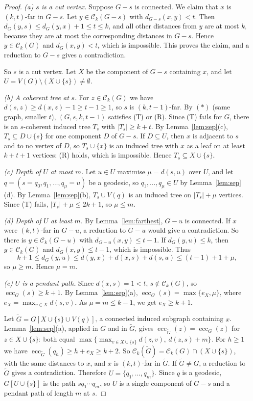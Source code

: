\documentclass[11pt,a4paper]{article}
\theoremstyle{definition}
\newcommand{\ecc}{\operatorname{ecc}}
\newcommand{\C}{\mathcal{C}}
\begin{document}
\begin{proof}
\emph{(a) $s$ is a cut vertex.} Suppose $G-s$ is connected. We claim that $x$ is $(k,t)$-far in $G-s$. Let $y\in\C_k(G-s)$ with $d_{G-s}(x,y)<t$. Then $d_G(y,s)\le d_G(y,x)+1\le t\le k$, and all other distances from $y$ are at most $k$, because they are at most the corresponding distances in $G-s$. Hence $y\in\C_k(G)$ and $d_G(x,y)<t$, which is impossible. This proves the claim, and a reduction to $G-s$ gives a contradiction.

So $s$ is a cut vertex. Let $X$ be the component of $G-s$ containing $x$, and let $U=V(G)\setminus(X\cup\{s\})\ne\emptyset$.

\emph{(b) A coherent tree at $s$.} For $z\in\C_k(G)$ we have $d(s,z)\ge d(x,z)-1\ge t-1\ge1$, so $s$ is $(k,t-1)$-far. By $(\ast)$ (same graph, smaller $t$), $(G,s,k,t-1)$ satisfies (T) or (R). Since (T) fails for $G$, there is an $s$-coherent induced tree $T_s$ with $|T_s|\ge k+t$. By Lemma~\ref{lem:sep}(c), $T_s\subseteq D\cup\{s\}$ for one component $D$ of $G-s$. If $D\subseteq U$, then $x$ is adjacent to $s$ and to no vertex of $D$, so $T_s\cup\{x\}$ is an induced tree with $x$ as a leaf on at least $k+t+1$ vertices: (R) holds, which is impossible. Hence $T_s\subseteq X\cup\{s\}$.

\emph{(c) Depth of $U$ at most $m$.} Let $u\in U$ maximise $\mu=d(s,u)$ over $U$, and let $q=(s=q_0,q_1,\dots,q_\mu=u)$ be a geodesic, so $q_1,\dots,q_\mu\in U$ by Lemma~\ref{lem:sep}(d). By Lemma~\ref{lem:sep}(b), $T_s\cup V(q)$ is an induced tree on $|T_s|+\mu$ vertices. Since (T) fails, $|T_s|+\mu\le 2k+1$, so $\mu\le m$.

\emph{(d) Depth of $U$ at least $m$.} By Lemma~\ref{lem:farthest}, $G-u$ is connected. If $x$ were $(k,t)$-far in $G-u$, a reduction to $G-u$ would give a contradiction. So there is $y\in\C_k(G-u)$ with $d_{G-u}(x,y)\le t-1$. If $d_G(y,u)\le k$, then $y\in\C_k(G)$ and $d_G(x,y)\le t-1$, which is impossible. Thus
\[
k+1\le d_G(y,u)\le d(y,x)+d(x,s)+d(s,u)\le (t-1)+1+\mu ,
\]
so $\mu\ge m$. Hence $\mu=m$.

\emph{(e) $U$ is a pendant path.} Since $d(x,s)=1<t$, $s\notin\C_k(G)$, so $\ecc_G(s)\ge k+1$. By Lemma~\ref{lem:sep}(a), $\ecc_G(s)=\max\{e_X,\mu\}$, where $e_X=\max_{v\in X}d(s,v)$. As $\mu=m\le k-1$, we get $e_X\ge k+1$.

Let $\tilde G=G[X\cup\{s\}\cup V(q)]$, a connected induced subgraph containing $x$. Lemma~\ref{lem:sep}(a), applied in $G$ and in $\tilde G$, gives $\ecc_{\tilde G}(z)=\ecc_G(z)$ for $z\in X\cup\{s\}$: both equal $\max\{\max_{v\in X\cup\{s\}}d(z,v),\ d(z,s)+m\}$. For $h\ge1$ we have $\ecc_{\tilde G}(q_h)\ge h+e_X\ge k+2$. So $\C_k(\tilde G)=\C_k(G)\cap(X\cup\{s\})$, with the same distances to $x$, and $x$ is $(k,t)$-far in $\tilde G$. If $\tilde G\ne G$, a reduction to $\tilde G$ gives a contradiction. Therefore $U=\{q_1,\dots,q_m\}$. Since $q$ is a geodesic, $G[U\cup\{s\}]$ is the path $sq_1\cdots q_m$, so $U$ is a single component of $G-s$ and a pendant path of length $m$ at $s$.
\end{proof}
\end{document}
